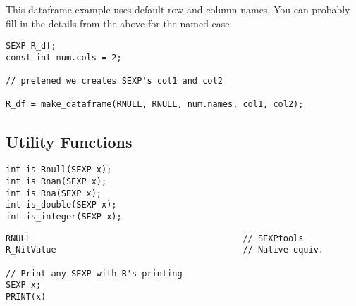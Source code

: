 This dataframe example uses \R default row and column names.  You can probably fill in the
details from the above for the named case.
\begin{lstlisting}[language=fanC,title=Dataframes]
SEXP R_df;
const int num.cols = 2;

// pretened we creates SEXP's col1 and col2

R_df = make_dataframe(RNULL, RNULL, num.names, col1, col2);
\end{lstlisting}



\subsection{Utility Functions}

\begin{lstlisting}[language=fanC,title=Testers]
int is_Rnull(SEXP x);
int is_Rnan(SEXP x);
int is_Rna(SEXP x);
int is_double(SEXP x);
int is_integer(SEXP x);
\end{lstlisting}



\begin{lstlisting}[language=fanC,title=Misc]
RNULL                                          // SEXPtools
R_NilValue                                     // Native equiv.

// Print any SEXP with R's printing
SEXP x;
PRINT(x)
\end{lstlisting}


